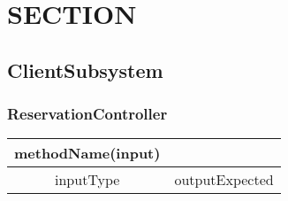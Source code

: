 \documentclass{article}
\begin{document}
\section{SECTION}
\subsection{ClientSubsystem}
\subsubsection{ReservationController}

\begin{tabular}[c]{| c | c |}
\hline
methodName(input) \\
\hline
inputType & outputExpected \\
\hline
\end{tabular}
\end{document}

